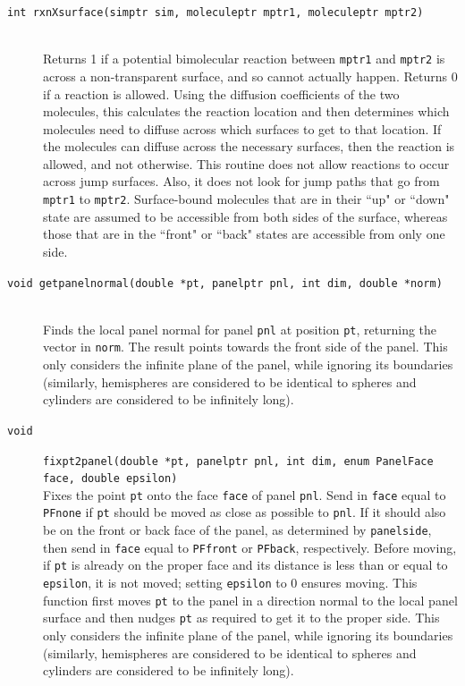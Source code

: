 \documentclass {scrbook}
\newcommand {\ttt} {\texttt}
\begin{document}
\begin{description}
\item[\ttt{int rxnXsurface(simptr sim, moleculeptr mptr1, moleculeptr mptr2)}]
\hfill \\
Returns 1 if a potential bimolecular reaction between \ttt{mptr1} and \ttt{mptr2} is across a non-transparent surface, and so cannot actually happen. Returns 0 if a reaction is allowed. Using the diffusion coefficients of the two molecules, this calculates the reaction location and then determines which molecules need to diffuse across which surfaces to get to that location. If the molecules can diffuse across the necessary surfaces, then the reaction is allowed, and not otherwise. This routine does not allow reactions to occur across jump surfaces. Also, it does not look for jump paths that go from \ttt{mptr1} to \ttt{mptr2}. Surface-bound molecules that are in their ``up" or ``down" state are assumed to be accessible from both sides of the surface, whereas those that are in the ``front" or ``back" states are accessible from only one side.

\item[\ttt{void getpanelnormal(double *pt, panelptr pnl, int dim, double *norm)}]
\hfill \\
Finds the local panel normal for panel \ttt{pnl} at position \ttt{pt}, returning the vector in \ttt{norm}. The result points towards the front side of the panel. This only considers the infinite plane of the panel, while ignoring its boundaries (similarly, hemispheres are considered to be identical to spheres and cylinders are considered to be infinitely long).

\item[\ttt{void}]
\ttt{fixpt2panel(double *pt, panelptr pnl, int dim, enum PanelFace face, double epsilon)}
\hfill \\
Fixes the point \ttt{pt} onto the face \ttt{face} of panel \ttt{pnl}. Send in \ttt{face} equal to \ttt{PFnone} if \ttt{pt} should be moved as close as possible to \ttt{pnl}. If it should also be on the front or back face of the panel, as determined by \ttt{panelside}, then send in \ttt{face} equal to \ttt{PFfront} or \ttt{PFback}, respectively. Before moving, if \ttt{pt} is already on the proper face and its distance is less than or equal to \ttt{epsilon}, it is not moved; setting \ttt{epsilon} to 0 ensures moving. This function first moves \ttt{pt} to the panel in a direction normal to the local panel surface and then nudges \ttt{pt} as required to get it to the proper side. This only considers the infinite plane of the panel, while ignoring its boundaries (similarly, hemispheres are considered to be identical to spheres and cylinders are considered to be infinitely long).


\end{description}
\end{document}
